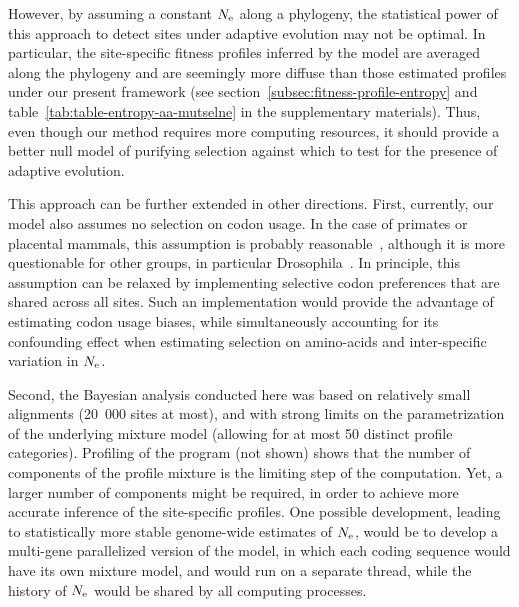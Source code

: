 However, by assuming a constant $N_{\text{e}}$ along a phylogeny, the statistical power of this approach to detect sites under adaptive evolution may not be optimal.
In particular, the site-specific fitness profiles inferred by the model are averaged along the phylogeny and are seemingly more diffuse than those estimated profiles under our present framework (see section~\ref{subsec:fitness-profile-entropy} and table~\ref{tab:table-entropy-aa-mutselne} in the supplementary materials).
Thus, even though our method requires more computing resources, it should provide a better null model of purifying selection against which to test for the presence of adaptive evolution.

This approach can be further extended in other directions.
First, currently, our model also assumes no selection on \gls{codon} usage.
In the case of primates or placental mammals, this assumption is probably reasonable~\citep{Yang2008}, although it is more questionable for other groups, in particular Drosophila~\citep{Duret1999,Plotkin2011}.
In principle, this assumption can be relaxed by implementing selective \gls{codon} preferences that are shared across all sites.
Such an implementation would provide the advantage of estimating \gls{codon} usage biases, while simultaneously accounting for its confounding effect when estimating selection on amino-acids and inter-specific variation in $N_{\text{e}}$.

Second, the Bayesian analysis conducted here was based on relatively small alignments (20~000 sites at most), and with strong limits on the parametrization of the underlying mixture model (allowing for at most 50 distinct profile categories).
Profiling of the program (not shown) shows that the number of components of the profile mixture is the limiting step of the computation.
Yet, a larger number of components might be required, in order to achieve more accurate inference of the site-specific profiles.
One possible development, leading to statistically more stable genome-wide estimates of $N_{\text{e}}$, would be to develop a multi-gene parallelized version of the model, in which each coding sequence would have its own mixture model, and would run on a separate thread, while the history of $N_{\text{e}}$ would be shared by all computing processes.

